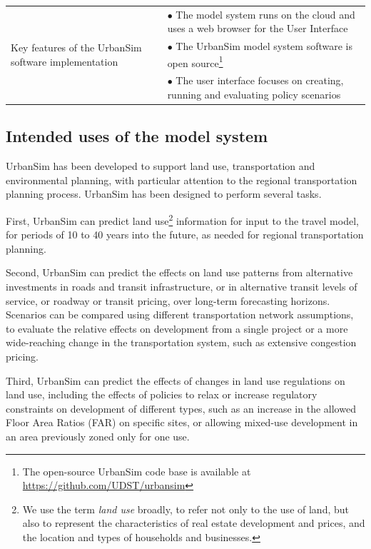 \begin{table}[htbp]
\begin{center}
\begin{tabular}{ p{} p{} }
    \midrule
    
    \multirow[c]{3}{0.2\textwidth}{Key features of the UrbanSim software implementation}
    & $\bullet$ The model system runs on the cloud and uses a web browser for the User Interface\\
    & $\bullet$ The UrbanSim model system software is open source\footnote{The open-source UrbanSim code base is available at \url{https://github.com/UDST/urbansim}}\\
    & $\bullet$ The user interface focuses on creating, running and evaluating policy scenarios\\
    
    \bottomrule
\end{tabular}
\end{center}
\end{table}

\subsection{Intended uses of the model system}

UrbanSim has been developed to support land use, transportation and environmental planning, with particular attention to the regional transportation planning process. UrbanSim has been designed to perform several tasks.

First, UrbanSim can predict land use\footnote{We use the term \emph{land use} broadly, to refer not only to the
use of land, but also to represent the characteristics of real estate development and prices, and the location and types of households and businesses.} information for input to the travel model, for periods of 10 to 40 years into the future, as needed for regional transportation planning.

Second, UrbanSim can predict the effects on land use patterns from alternative investments in roads and transit infrastructure, or in alternative transit levels of service, or roadway or transit pricing, over long-term forecasting horizons. Scenarios can be compared using different transportation network assumptions, to evaluate the relative effects on development from a single project or a more wide-reaching change in the transportation system, such as extensive congestion pricing.

Third, UrbanSim can predict the effects of changes in land use regulations on land use, including the effects of policies to relax or increase regulatory constraints on development of different types, such as an increase in the allowed Floor Area Ratios (FAR) on specific sites, or allowing mixed-use development in an area previously zoned only for one use.

